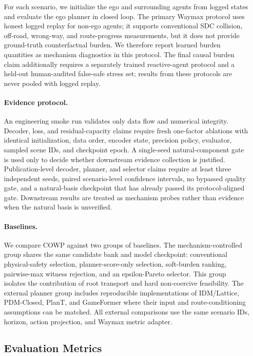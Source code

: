 \documentclass[10pt]{article}
\begin{document}
For each scenario, we initialize the ego and surrounding agents from logged states and evaluate the ego planner in closed loop. The primary Waymax protocol uses honest logged replay for non-ego agents; it supports conventional SDC collision, off-road, wrong-way, and route-progress measurements, but it does not provide ground-truth counterfactual burden. We therefore report learned burden quantities as mechanism diagnostics in this protocol. The final causal burden claim additionally requires a separately trained reactive-agent protocol and a held-out human-audited false-safe stress set; results from these protocols are never pooled with logged replay.

\paragraph{Evidence protocol.}
An engineering smoke run validates only data flow and numerical integrity. Decoder, loss, and residual-capacity claims require fresh one-factor ablations with identical initialization, data order, encoder state, precision policy, evaluator, sampled scene IDs, and checkpoint epoch. A single-seed natural-component gate is used only to decide whether downstream evidence collection is justified. Publication-level decoder, planner, and selector claims require at least three independent seeds, paired scenario-level confidence intervals, no bypassed quality gate, and a natural-basis checkpoint that has already passed its protocol-aligned gate. Downstream results are treated as mechanism probes rather than evidence when the natural basis is unverified.

\paragraph{Baselines.}
We compare COWP against two groups of baselines. The mechanism-controlled group shares the same candidate bank and model checkpoint: conventional physical-safety selection, planner-score-only selection, soft-burden ranking, pairwise-max witness rejection, and an epsilon-Pareto selector. This group isolates the contribution of root transport and hard non-coercive feasibility. The external planner group includes reproducible implementations of IDM/Lattice, PDM-Closed, PlanT, and GameFormer where their input and route-conditioning assumptions can be matched. All external comparisons use the same scenario IDs, horizon, action projection, and Waymax metric adapter.

\subsection{Evaluation Metrics}
\label{sec:metrics}
\end{document}
